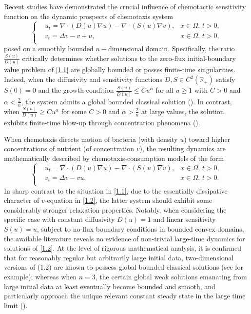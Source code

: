 \documentclass[12pt]{article}
\theoremstyle{plain}
\theoremstyle{definition}
\numberwithin{equation}{section}
\begin{document}
 Recent studies have demonstrated the crucial influence of chemotactic sensitivity function  on the dynamic prospects of chemotaxis system
 \begin{equation}\label{1.1}
\left\{
\begin{aligned}
&u_{t}= \nabla \cdot (D(u)\nabla u)-\nabla \cdot (S(u)\nabla v),&x\in \Omega,\, t>0,\\
& v_{t}=\Delta v -v+u,&x\in \Omega,\, t>0,\\
\end{aligned}
\right.
\end{equation}
posed on a smoothly bounded $n-$dimensional domain.
  Specifically, the ratio $\frac{S(u)}{D(u)}$ critically determines
whether solutions to the zero-flux initial-boundary value problem of \eqref{1.1}
are globally bounded or posses finite-time singularities. Indeed, when
 the diffusivity and sensitivity functions $D,S\in C^2(\mathbb R_+)$ satisfy $S(0)=0$ and the growth condition  $\frac{S(u)}{D(u)}\leq Cu^{\alpha}$ for all $u\geq1$ with $C>0$ and $\alpha<\frac{2}{n}$, the system  admits a global bounded classical solution (\cite{SKT, TaoW}). In contrast, when $\frac{S(u)}{D(u)}\geq Cu^{\alpha}$ for some $C>0$ and $\alpha>\frac{2}{n}$ at large values, the solution exhibits finite-time blow-up through concentration phenomena (\cite{TC1, TC2}).

 When chemotaxis directs motion  of bacteria (with density $u$) toward higher concentrations of nutrient (of
concentration $v$), the resulting dynamics are mathematically described by chemotaxis-consumption models of the form
\begin{equation}\label{1.2}
\left\{
\begin{aligned}
&u_{t}= \nabla \cdot (D(u)\nabla u)-\nabla \cdot (S(u)\nabla v),&x\in \Omega,\, t>0,\\
& v_{t}=\Delta v -vu,&x\in \Omega,\, t>0.\\
\end{aligned}
\right.
\end{equation}
In sharp contrast to the situation in \eqref{1.1}, due to the essentially dissipative character of   $v$-equation in \eqref{1.2},
 the latter system should exhibit some considerably stronger relaxation properties.  Notably, when considering the specific case with constant diffusivity $D(u)=1$  and linear sensitivity $S(u)=u$, subject to no-flux boundary conditions in bounded convex domains, the available literature reveals no evidence of non-trivial large-time dynamics for solutions of \eqref{1.2}.
 At the level of rigorous mathematical analysis, it is confirmed that for reasonably regular but arbitrarily large initial data, two-dimensional versions of (1.2) are known to possess global bounded classical  solutions (see \cite{Jinwang,TaoW2} for example); whereas when $n =3$, the certain global weak solutions  emanating from large initial data
 at least eventually become bounded and smooth, and particularly  approach the
unique relevant constant steady state in the large time limit (\cite{TaoW2,WinklerJDE2017}).
\end{document}

